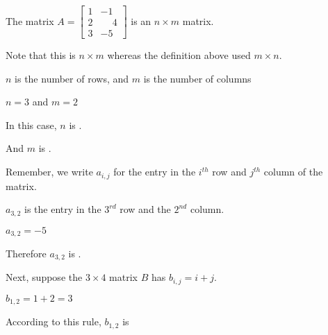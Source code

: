 \documentclass{ximera}
\begin{document}
\begin{question}
  The matrix $A = \begin{bmatrix}
    1&-1\\2&\phantom{-}4\\3&-5
  \end{bmatrix}$
  is an $n \times m$ matrix.  

  \begin{solution}
    \begin{hint}
      Note that this is $n \times m$ whereas the definition above used $m \times n$.
    \end{hint}
    \begin{hint}
    	$n$ is the number of rows, and $m$ is the number of columns 
    \end{hint}
    \begin{hint}
    	$n=3$  and $m=2$
    \end{hint}

    In this case, $n$ is .
  \end{solution}

  \begin{solution}
    And $m$ is .
  \end{solution}

  Remember, we write $a_{i,j}$ for the entry in the $i^{th}$ row and $j^{th}$ column of the matrix.


  \begin{solution}
  	\begin{hint}
  		$a_{3,2}$ is the entry in the $3^{rd}$ row and the $2^{nd}$ column.
  	\end{hint}
  	\begin{hint}
  		$a_{3,2} = -5$
  	\end{hint}
    Therefore $a_{3,2}$ is .
  \end{solution}

  Next, suppose the $3 \times 4$ matrix $B$ has $b_{i,j} = i+j$.

  \begin{solution}
   \begin{hint}
   		\begin{problem}
   			\begin{solution}
   			\begin{hint}
   				$b_{1,2} = 1+2 = 3$
   			\end{hint}
   			According to this rule, $b_{1,2}$ is 
   			\end{solution} 
   		\end{problem}
   		

\end{hint}
\end{solution}
\end{question}
\end{document}
